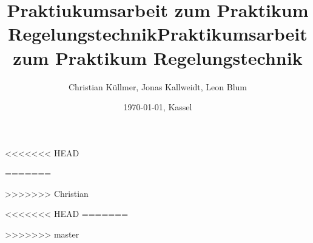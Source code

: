 \documentclass[10pt]{scrartcl}
\begin{document}
<<<<<<< HEAD
\title{Praktiukumsarbeit zum Praktikum Regelungstechnik}
=======










\title{Praktikumsarbeit zum Praktikum Regelungstechnik}
>>>>>>> Christian
\author{Christian Küllmer, Jonas Kallweidt, Leon Blum}
\date{\today{}, Kassel}
\maketitle
\newpage
\renewcommand{\contentsname}{Inhaltsverzeichnis}
\tableofcontents
\newpage
\listoffigures
<<<<<<< HEAD
=======
\newpage



>>>>>>> master
\end{document}

